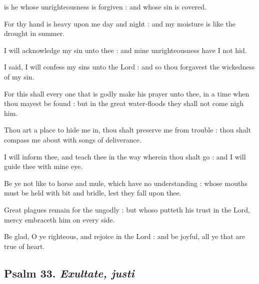  is he whose unrighteousness is forgiven : and whose sin is covered.\par
{}
For thy hand is heavy upon me day and night : and my moisture is like the drought in summer.\par
{}I will acknowledge my sin unto thee : and mine unrighteousness have I not hid.\par
{}I said, I will confess my sins unto the Lord : and so thou forgavest the wickedness of my sin.\par
{}For this shall every one that is godly make his prayer unto thee, in a time when thou mayest be found : but in the great water-floods they shall not come nigh him.\par
{}Thou art a place to hide me in, thou shalt preserve me from trouble : thou shalt compass me about with songs of deliverance.\par
{}I will inform thee, and teach thee in the way wherein thou shalt go : and I will guide thee with mine eye.\par
{}Be ye not like to horse and mule, which have no understanding : whose mouths must be held with bit and bridle, lest they fall upon thee.\par
{}Great plagues remain for the ungodly : but whoso putteth his trust in the Lord, mercy embraceth him on every side.\par
{}Be glad, O ye righteous, and rejoice in the Lord : and be joyful, all ye that are true of heart.\par

\subsection{Psalm 33. \textit{Exultate, justi}}

